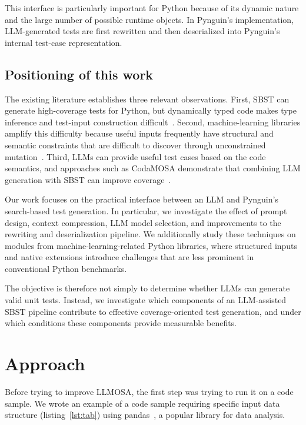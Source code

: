 \documentclass{article}
\begin{document}
This interface is particularly important for Python because of its dynamic nature and the large number of possible runtime objects. In Pynguin's implementation, LLM-generated tests are first rewritten and then deserialized into Pynguin's internal test-case representation.

\subsection{Positioning of this work}
The existing literature establishes three relevant observations. First, SBST can generate high-coverage tests for Python, but dynamically typed code makes type inference and test-input construction difficult~\cite{Lukasczyk_Pynguin_Automated_Unit_2022}. Second, machine-learning libraries amplify this difficulty because useful inputs frequently have structural and semantic constraints that are difficult to discover through unconstrained mutation~\cite{Lucas_Berg_Improving_automated_unit_test_generation_for_machine_learning_libraries_using_structured_input_data_2024}. Third, LLMs can provide useful test cases based on the code semantics, and approaches such as CodaMOSA demonstrate that combining LLM generation with SBST can improve coverage~\cite{10172800}.

Our work focuses on the practical interface between an LLM and Pynguin's search-based test generation. In particular, we investigate the effect of prompt design, context compression, LLM model selection, and improvements to the rewriting and deserialization pipeline. We additionally study these techniques on modules from machine-learning-related Python libraries, where structured inputs and native extensions introduce challenges that are less prominent in conventional Python benchmarks.

The objective is therefore not simply to determine whether LLMs can generate valid unit tests. Instead, we investigate which components of an LLM-assisted SBST pipeline contribute to effective coverage-oriented test generation, and under which conditions these components provide measurable benefits.


\section{Approach}\label{sec:approach}
Before trying to improve LLMOSA, the first step was trying to run it on a code sample.
We wrote an example of a code sample requiring specific input data structure (listing~\ref{lst:tab}) using pandas~\cite{The_pandas_development_team_pandas-dev_pandas_Pandas}, a popular library for data analysis.
\end{document}
